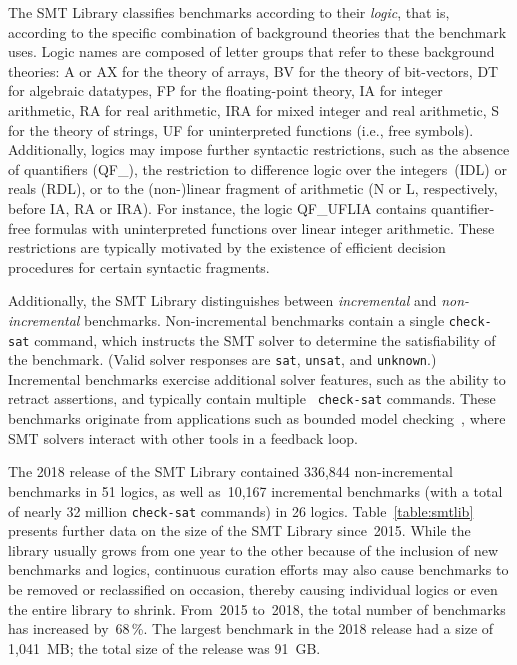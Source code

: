 \documentclass[dvipsnames,table,twoside,11pt]{article}
\begin{document}
The SMT Library classifies benchmarks according to their \emph{logic},
that is, according to the specific combination of background theories
that the benchmark uses.  Logic names are composed of letter groups
that refer to these background theories: {A} or {AX} for the theory of
arrays, {BV} for the theory of bit-vectors, {DT} for algebraic
datatypes, {FP} for the floating-point theory, {IA} for integer
arithmetic, {RA} for real arithmetic, {IRA} for mixed integer and real
arithmetic, {S} for the theory of strings, {UF} for uninterpreted
functions (i.e., free symbols).  Additionally, logics may impose
further syntactic restrictions, such as the absence of quantifiers
({QF\_}), the restriction to difference logic over the
integers~({IDL}) or reals ({RDL}), or to the (non-)linear fragment of
arithmetic ({N} or {L}, respectively, before {IA}, {RA} or {IRA}).
For instance, the logic QF\_UFLIA contains quantifier-free formulas
with uninterpreted functions over linear integer arithmetic.  These
restrictions are typically motivated by the existence of efficient
decision procedures for certain syntactic fragments.

Additionally, the SMT Library distinguishes between \emph{incremental}
and \emph{non-incremental} benchmarks.  Non-incremental benchmarks
contain a single {\tt check-sat} command, which instructs the SMT
solver to determine the satisfiability of the benchmark.  (Valid
solver responses are {\tt sat}, {\tt unsat}, and {\tt unknown}.)
Incremental benchmarks exercise additional solver features, such as
the ability to retract assertions, and typically contain multiple {\tt
  check-sat} commands.  These benchmarks originate from applications
such as bounded model
checking~\cite{Gunther:2014:IBS:2632362.2632374}, where SMT solvers
interact with other tools in a feedback loop.

The 2018 release of the SMT Library contained 336,844 non-incremental
benchmarks in 51 logics, as well as~10,167 incremental benchmarks
(with a total of nearly 32 million {\tt check-sat} commands) in 26
logics.  Table~\ref{table:smtlib} presents further data on the size of
the SMT Library since~2015.  While the library usually grows from one
year to the other because of the inclusion of new benchmarks and
logics, continuous curation efforts may also cause benchmarks to be
removed or reclassified on occasion, thereby causing individual logics
or even the entire library to shrink.  From~2015 to~2018, the total
number of benchmarks has increased by~68\,\%.  The largest benchmark
in the 2018 release had a size of 1,041~MB; the total size of the
release was 91~GB.
\end{document}
